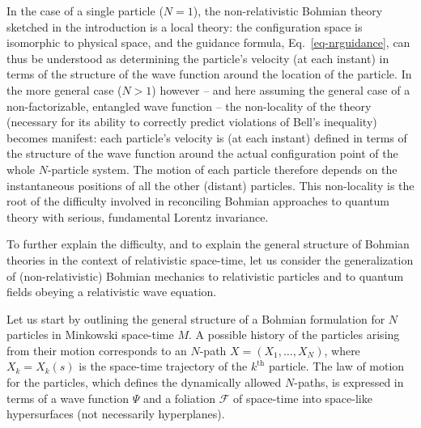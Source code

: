\documentclass[12pt]{article}
\begin{document}
In the case of a single particle ($N=1$), the non-relativistic Bohmian
theory sketched in the introduction is a local theory:  the
configuration space is isomorphic to physical space, and the guidance
formula, Eq.~\eqref{eq-nrguidance}, can thus be understood as determining
the particle's velocity (at each instant) in terms of the structure of 
the wave function around the location of the particle.  In the more
general case ($N > 1$) however -- and here assuming the general case
of a non-factorizable, entangled wave function --  
the non-locality of the theory
(necessary for its ability to correctly predict violations of Bell's
inequality) becomes manifest:  each particle's velocity is (at each
instant) defined in terms of the structure of the wave function around the
actual configuration point of the whole $N$-particle system.  The 
motion of each particle therefore depends 
on the instantaneous positions of all the other (distant) particles. This non-locality is the root of the difficulty involved in reconciling Bohmian approaches to quantum theory with serious,
fundamental Lorentz invariance.  

To further explain the difficulty,
and to explain the general structure of Bohmian theories in the
context of relativistic space-time, let us consider the generalization
of (non-relativistic) Bohmian mechanics to relativistic 
particles and to quantum fields obeying a relativistic wave equation.

Let us start by outlining the general structure of a Bohmian formulation for $N$ particles in Minkowski space-time $M$. A possible history of the particles arising from their motion corresponds to an $N$-path $X=(X_1,\dots,X_N)$, where $X_k=X_k(s)$ is the space-time trajectory of the $k^{\textrm{th}}$ particle. The law of motion for the particles, which defines the dynamically allowed $N$-paths, is expressed in terms of a wave function $\Psi$ and a foliation $\mathscr{F}$ of space-time into space-like hypersurfaces (not necessarily hyperplanes).
\end{document}
